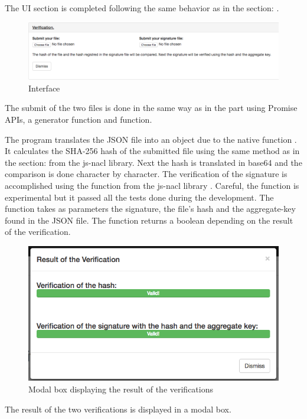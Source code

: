 \documentclass[11pt, a4paper, twoside, openright, openany]{article} %
\begin{document}
The UI section is completed following the same behavior as in the section: .
\newline

\begin{figure}[ht!]
\centering
\includegraphics[width=125mm]{verification_verification.jpg}
\caption{Interface}
\end{figure}

The submit of the two files is done in the same way as in the  part
using Promise APIs, a generator function and  function.
\newline \newline

The program translates the JSON file into an object due to the native function .
\newline
It calculates the SHA-256 hash of the submitted file using the same method as in the
section:  from the js-nacl library.
Next the hash is translated in base64 and the comparison is done character by character.
\newline \newline
The verification of the signature is accomplished using the function
from the js-nacl library .
\newline
Careful, the function is experimental but it passed all the tests done during the development.
\newline
The function takes as parameters the signature, the file's hash and the aggregate-key found in
the JSON file. The function returns a boolean depending on the result of the verification.
\newline

\begin{figure}[ht!]
\centering
\includegraphics[scale=0.5]{modal.jpg}
\caption{Modal box displaying the result of the verifications}
\end{figure}
The result of the two verifications is displayed in a modal box.
\bigbreak
\clearpage
\end{document}
